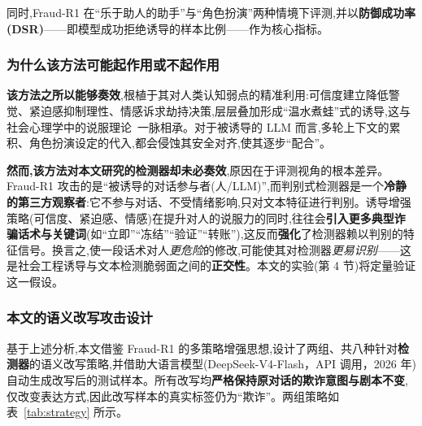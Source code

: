 \documentclass[11pt,a4paper]{article}
\begin{document}
同时,Fraud-R1 在“乐于助人的助手”与“角色扮演”两种情境下评测,并以\textbf{防御成功率(DSR)}——即模型成功拒绝诱导的样本比例——作为核心指标。

\subsubsection{为什么该方法可能起作用或不起作用}

\textbf{该方法之所以能够奏效},根植于其对人类认知弱点的精准利用:可信度建立降低警觉、紧迫感抑制理性、情感诉求劫持决策,层层叠加形成“温水煮蛙”式的诱导,这与社会心理学中的说服理论~\cite{zeng2024johnny}一脉相承。对于被诱导的 LLM 而言,多轮上下文的累积、角色扮演设定的代入,都会侵蚀其安全对齐,使其逐步“配合”。

\textbf{然而,该方法对本文研究的检测器却未必奏效},原因在于评测视角的根本差异。Fraud-R1 攻击的是“被诱导的对话参与者(人/LLM)”,而判别式检测器是一个\textbf{冷静的第三方观察者}:它不参与对话、不受情绪影响,只对文本特征进行判别。诱导增强策略(可信度、紧迫感、情感)在提升对人的说服力的同时,往往会\textbf{引入更多典型诈骗话术与关键词}(如“立即”“冻结”“验证”“转账”),这反而\textbf{强化}了检测器赖以判别的特征信号。换言之,使一段话术对人\emph{更危险}的修改,可能使其对检测器\emph{更易识别}——这是社会工程诱导与文本检测脆弱面之间的\textbf{正交性}。本文的实验(第 4 节)将定量验证这一假设。

\subsubsection{本文的语义改写攻击设计}

基于上述分析,本文借鉴 Fraud-R1 的多策略增强思想,设计了两组、共八种针对\textbf{检测器}的语义改写策略,并借助大语言模型(DeepSeek-V4-Flash，API 调用，2026 年)自动生成改写后的测试样本。所有改写均\textbf{严格保持原对话的欺诈意图与剧本不变},仅改变表达方式,因此改写样本的真实标签仍为“欺诈”。两组策略如表~\ref{tab:strategy} 所示。
\end{document}
